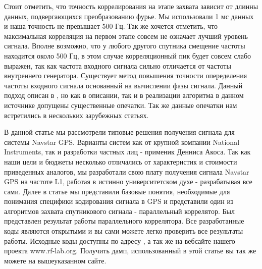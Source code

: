 \documentclass[a4paper,12pt]{article}
\numberwithin{table}{section}
\begin{document}
Стоит отметить, что точность коррелирования на этапе захвата зависит от длинны данных, подвергающихся преобразованию фурье.
Мы использовали 1 мс данных и наша точность не превышает 500 Гц. Так же хочется отметить, что максимальная корреляция на 
первом этапе совсем не означает лучший уровень сигнала. Вполне возможно, что у любого другого спутника смещение частоты
находится около 500 Гц, в этом случае корреляционный пик будет совсем слабо выражен, так как частота входного сигнала
сильно отличается от частоты внутреннего генератора. Существует метод повышения точности опеределения частоты
входного сигнала основанный на вычислении фазы сигнала. Данный подход описан в \cite{tsui}, но как в описании, так и в
реализации алгоритма в данном источнике допущены существенные опечатки. Так же данные опечатки нам встретились 
в нескольких зарубежных статьях.

В данной статье мы рассмотрели типовые решения получения сигнала для системы Navstar GPS. Варианты систем
как от крупной компании National Instruments, так и разработки частных лиц - применик Денниса Акоса. 
Так как наши цели и бюджеты несколько отличались от характеристик и стоимости приведенных аналогов, мы разработали
свою плату получения сигнала Navstar GPS на частоте L1, работая в истинно университетском духе - разрабатывая все сами.
Далее в статье мы представили базовые понятия, необходимые для понимания специфики кодирования сигнала в  GPS и
представили один из алгоритмов захвата спутникового сигнала - параллельный коррелятор. Был представлен
результат работы параллельного коррелятора. Все разработанные коды являются открытыми и вы сами можете легко проверить
все результаты работы. Исходные коды доступны по адресу \cite{gpsproject}, а так же на вебсайте нашего проекта www.rf-lab.org.
Получить дамп, использованный в этой статье вы так же можете на вышеуказанном сайте.


\end{document}

